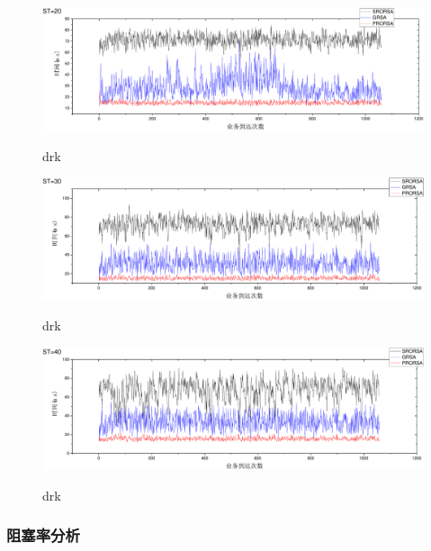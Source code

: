 \begin{figure}
\setlength{\belowcaptionskip}{-0.5cm}
  \begin{center}
    {\includegraphics[width=1 \textwidth]{figures/B20T.pdf}}
    \end{center}
  \caption{{\footnotesize{drk}}}
  \label{drk}
\end{figure}
\begin{figure}
\setlength{\belowcaptionskip}{-0.5cm}
  \begin{center}
    {\includegraphics[width=1 \textwidth]{figures/B30T.pdf}}
    \end{center}
  \caption{{\footnotesize{drk}}}
  \label{drk}
\end{figure}
\begin{figure}
\setlength{\belowcaptionskip}{-0.5cm}
  \begin{center}
    {\includegraphics[width=1 \textwidth]{figures/B40T.pdf}}
    \end{center}
  \caption{{\footnotesize{drk}}}
  \label{drk}
\end{figure}
\subsubsection{阻塞率分析}

